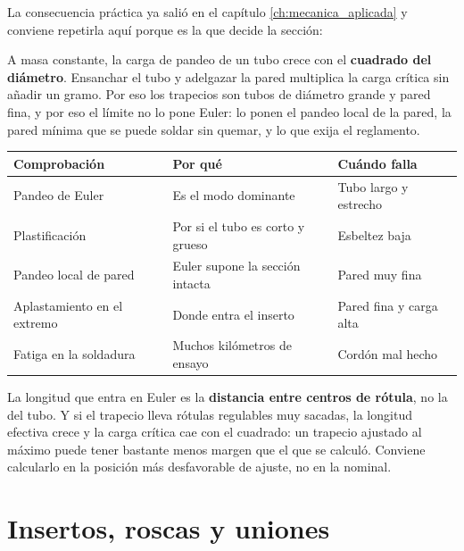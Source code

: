 La consecuencia práctica ya salió en el capítulo \ref{ch:mecanica_aplicada} y
conviene repetirla aquí porque es la que decide la sección:

\begin{clave}
A masa constante, la carga de pandeo de un tubo crece con el \textbf{cuadrado
del diámetro}. Ensanchar el tubo y adelgazar la pared multiplica la carga
crítica sin añadir un gramo. Por eso los trapecios son tubos de diámetro grande
y pared fina, y por eso el límite no lo pone Euler: lo ponen el pandeo local de
la pared, la pared mínima que se puede soldar sin quemar, y lo que exija el
reglamento.
\end{clave}

\begin{center}
\begin{tabularx}{\textwidth}{@{}lXl@{}}
\toprule
\textbf{Comprobación} & \textbf{Por qué} & \textbf{Cuándo falla} \\
\midrule
Pandeo de Euler & Es el modo dominante & Tubo largo y estrecho \\
Plastificación & Por si el tubo es corto y grueso & Esbeltez baja \\
Pandeo local de pared & Euler supone la sección intacta & Pared muy fina \\
Aplastamiento en el extremo & Donde entra el inserto & Pared fina y carga alta \\
Fatiga en la soldadura & Muchos kilómetros de ensayo & Cordón mal hecho \\
\bottomrule
\end{tabularx}
\end{center}

\begin{ojo}
La longitud que entra en Euler es la \textbf{distancia entre centros de rótula},
no la del tubo. Y si el trapecio lleva rótulas regulables muy sacadas, la
longitud efectiva crece y la carga crítica cae con el cuadrado: un trapecio
ajustado al máximo puede tener bastante menos margen que el que se calculó.
Conviene calcularlo en la posición más desfavorable de ajuste, no en la nominal.
\end{ojo}

\section{Insertos, roscas y uniones}
\label{sec:componentes_suspension:02}

